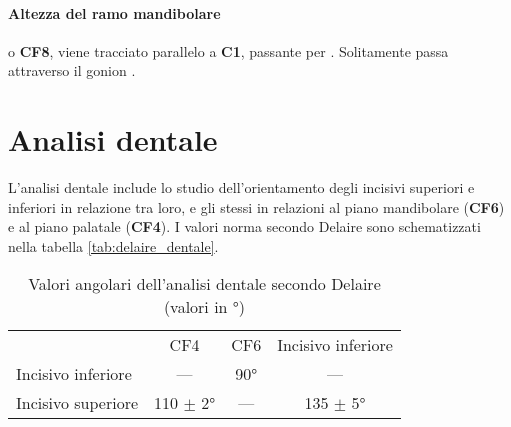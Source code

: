 \paragraph{Altezza del ramo mandibolare} o \textbf{CF8}, viene tracciato parallelo a \textbf{C1}, passante per . Solitamente passa attraverso il gonion .

\section{Analisi dentale}
L'analisi dentale include lo studio dell'orientamento degli incisivi superiori e inferiori in relazione tra loro, e gli stessi in relazioni al piano mandibolare (\textbf{CF6}) e al piano palatale (\textbf{CF4}). I valori norma secondo Delaire sono schematizzati nella tabella \vref{tab:delaire_dentale}.

\begin{table}[h]
\centering
\caption{Valori angolari dell'analisi dentale secondo Delaire (valori in °)}
\label{tab:delaire_dentale}
\begin{tabular*}{.65\textwidth}{lccc}
\toprule
 & CF4 & CF6 & Incisivo inferiore \\
\cmidrule(r){2-4}
Incisivo inferiore & --- & 90° & --- \\
Incisivo superiore & 110 $\pm$ 2° & --- & 135 $\pm$ 5° \\
\bottomrule
\end{tabular*}
\end{table}
